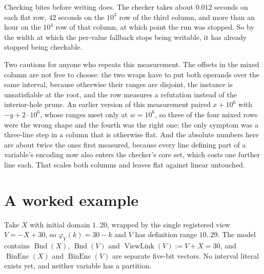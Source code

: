 \documentclass[11pt,a4paper]{article}
\theoremstyle{plain}
\theoremstyle{definition}
\theoremstyle{remark}
\newcommand{\fname}[1]{\ensuremath{\operatorname{#1}}}
\newcommand{\BinEnc}{\fname{BinEnc}}
\newcommand{\Bnd}{\fname{Bnd}}
\newcommand{\ViewLink}{\fname{ViewLink}}
\begin{document}
Checking bites before writing does.  The checker takes about $0.012$ seconds on
each flat row, $42$ seconds on the $10^3$ row of the third column, and more than
an hour on the $10^4$ row of that column, at which point the run was stopped.  So
by the width at which the per-value fallback stops being writable, it has already
stopped being checkable.

Two cautions for anyone who repeats this measurement.  The offsets in the mixed
column are not free to choose: the two wraps have to put both operands over the
same interval, because otherwise their ranges are disjoint, the instance is
unsatisfiable at the root, and the row measures a refutation instead of the
interior-hole prune.  An earlier version of this measurement paired $x+10^6$ with
$-y+2\cdot 10^6$, whose ranges meet only at $w=10^6$, so three of the four mixed
rows were the wrong shape and the fourth was the right one; the only symptom was
a three-line step in a column that is otherwise flat.  And the absolute numbers
here are about twice the ones first measured, because every line defining part of
a variable's encoding now also enters the checker's core set, which costs one
further line each.  That scales both columns and leaves flat against linear
untouched.

\appendix
{}

\section{A worked example}
\label{sec:worked}

Take $X$ with initial domain $1..20$, wrapped by the single registered view
$V = -X + 30$, so $\varphi_V(k) = 30-k$ and $V$ has definition range $10..29$.
The model contains $\Bnd(X)$, $\Bnd(V)$ and $\ViewLink(V) := V + X = 30$, and
$\BinEnc(X)$ and $\BinEnc(V)$ are separate five-bit vectors.  No interval
literal exists yet, and neither variable has a partition.
\end{document}
